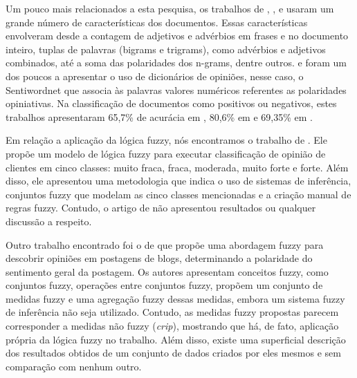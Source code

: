 \documentclass[template.tex]{subfiles}
\begin{document}
Um pouco mais relacionados a esta pesquisa, os trabalhos de , , e  usaram um grande número de características dos documentos. Essas características envolveram desde a contagem de adjetivos e advérbios em frases e no documento inteiro, tuplas de palavras (bigrams e trigrams), como advérbios e adjetivos combinados, até a soma das polaridades dos n-grams, dentre outros.  e  foram um dos poucos a apresentar o uso de dicionários de opiniões, nesse caso, o Sentiwordnet \cite{esuli2006sentiwordnet} que associa às palavras valores numéricos referentes as polaridades opiniativas. Na classificação de documentos como positivos ou negativos, estes trabalhos apresentaram 65,7\% de acurácia em , 80,6\% em  e 69,35\% em .

Em relação a aplicação da lógica fuzzy, nós encontramos o trabalho de . Ele propõe um modelo de lógica fuzzy para executar classificação de opinião de clientes em cinco classes: muito fraca, fraca, moderada, muito forte e forte. Além disso, ele apresentou uma metodologia que indica o uso de sistemas de inferência, conjuntos fuzzy que modelam as cinco classes mencionadas e a criação manual de regras fuzzy. Contudo, o artigo de  não apresentou resultados ou qualquer discussão a respeito.

Outro trabalho encontrado foi o de  que propõe uma abordagem fuzzy para descobrir opiniões em postagens de blogs, determinando a polaridade do sentimento geral da postagem. Os autores apresentam conceitos fuzzy, como conjuntos fuzzy, operações entre conjuntos fuzzy, propõem um conjunto de medidas fuzzy e uma agregação fuzzy dessas medidas, embora um sistema fuzzy de inferência não seja utilizado. Contudo, as medidas fuzzy propostas parecem corresponder a medidas não fuzzy (\textit{crip}), mostrando que há, de fato, aplicação própria da lógica fuzzy no trabalho. Além disso, existe uma superficial descrição dos resultados obtidos de um conjunto de dados criados por eles mesmos e sem comparação com nenhum outro.
\end{document}
